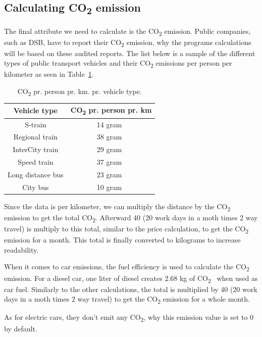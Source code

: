 \subsection{Calculating \unit{CO_{2}} emission}\label{subsec:calculating-co2-emission}

The final attribute we need to calculate is the \unit{CO_{2}} emission.
Public companies, such as DSB, have to report their \unit{CO_{2}} emission, why the programs calculations will be based
on these audited reports.
The list below is a sample of the different types of public transport vehicles and their \unit{CO_{2}} emissions per
person per kilometer as seen in Table~\ref{tab:emissions}.

\begin{table}[H]
    \centering
    \begin{tabular}{ || c | c || }
        \hline
        Vehicle type & \unit{CO_{2}} pr. person pr. km \\
        \hline\hline
        S-train & 14 gram~\cite{dsb2023} \\
        \hline
        Regional train & 38 gram~\cite{dsb2023} \\
        \hline
        InterCity train & 29 gram~\cite{dsb2023} \\
        \hline
        Speed train & 37 gram~\cite{dsb2023} \\
        \hline
        Long distance bus & 23 gram~\cite{cowi2022} \\
        \hline
        City bus & 10 gram~\cite{ntm2023} \\
        \hline
    \end{tabular}
    \caption{\unit{CO_{2}} pr. person pr. km. pr. vehicle type.}
    \label{tab:emissions}
\end{table}

Since the data is per kilometer, we can multiply the distance by the \unit{CO_{2}} emission to get the total
\unit{CO_{2}}.
Afterward 40 (20 work days in a moth times 2 way travel) is multiply to this total, similar to the price calculation, to get the
\unit{CO_{2}} emission for a month.
This total is finally converted to kilograms to increase readability.

When it comes to car emissions, the fuel efficiency is used to calculate the \unit{CO_{2}} emission.
For a diesel car, one liter of diesel creates 2.68 kg of \unit{CO_{2}}~\cite{co2_car} when used as car fuel.
Similarly to the other calculations, the total is multiplied by 40 (20 work days in a moth times 2 way travel) to get
the \unit{CO_{2}} emission for a whole month.

As for electric cars, they don't emit any \unit{CO_{2}}, why this emission value is set to 0 by default.
